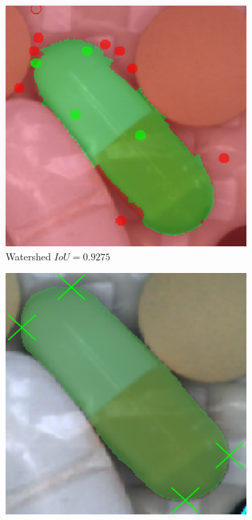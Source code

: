 	
\begin{figure} \ContinuedFloat
	\begin{subfigure}[t]{0.3\textwidth}
		\centering
		\includegraphics[width=\textwidth]{figures/appendix/method_predictions/pill56_watershed.png}
		\caption{
			Watershed $ IoU = 0.9275 $
		}
	\end{subfigure}
	\hfill
	\begin{subfigure}[t]{0.3\textwidth}
		\centering
		\includegraphics[width=\textwidth]{figures/appendix/method_predictions/pill56_dextr.png}

\end{subfigure}
\end{figure}
